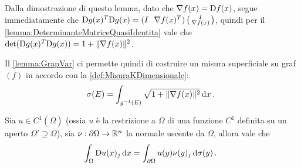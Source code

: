 \begin{remark}
	Dalla dimostrazione di questo lemma, dato che $\nabla f(x)=\mathrm D f(x)$, segue immediatamente che $\mathrm D g(x)^T \mathrm D g(x)=
	(I \ \ \nabla f(x)^T)
	\left(\begin{smallmatrix}
	I \\
	\nabla f(x)
	\end{smallmatrix}\right)$, quindi per il \cref{lemma:DeterminanteMatriceQuasiIdentita} vale che $\det (\mathrm D g(x)^T \mathrm D g(x)) = 1+\lVert\nabla f(x)\rVert^2$. 
\end{remark}

Il \cref{lemma:GrapVar} ci permette quindi di costruire un misura superficiale su graf$(f)$ in accordo con la \cref{def:MisuraKDimensionale}:
\begin{equation}\label{eq:MisuraSuperficialeGrafico}
	\sigma(E)=\int_{g^{-1}(E)} \sqrt{1+\lVert\nabla f(x)\rVert^2} \,\mathrm d x\, \text{. }
\end{equation}


\begin{theorem}\label{thm:Stokes}
	Sia $u\in C^1(\overline\Omega)$ (ossia $u$ è la restrizione a $\overline\Omega$ di una funzione $C^1$ definita su un aperto
	$\Omega'\supseteq \overline\Omega$), sia $\nu:\partial \Omega \rightarrow \mathbb R^n$ la normale uscente da $\Omega$, allora vale che
	\begin{equation}\label{eq:FormulaStokes}
		\int_{\Omega} \mathrm D u(x)_j \,\mathrm d x = \int_{\partial \Omega} u(y)\nu(y)_j \,\mathrm d \sigma(y)\, \text{. }
	\end{equation}
\end{theorem}


